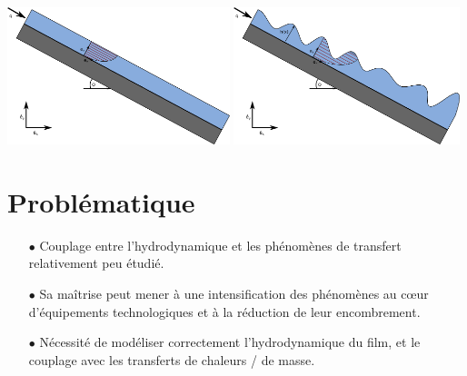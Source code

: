\documentclass[a0,portrait]{a0poster}
\begin{document}
\begin{multicols}{2}
    \begin{multicols}{2}
        \begin{center}\vspace{.2cm}
        \end{center}\vspace{.2cm}
        \columnbreak
        \begin{center}\vspace{.5cm}
        	\includegraphics[height=4cm]{thinfilm}
            \includegraphics[height=4cm]{thinfilm_unstable}
        \end{center}\vspace{.5cm}
    \end{multicols}

    \section*{Problématique}
    \begin{itemize}
    	\item[$\bullet$] Couplage entre l'hydrodynamique et les phénomènes de transfert relativement peu étudié.
    	\item[$\bullet$] Sa maîtrise peut mener à une intensification des phénomènes au cœur d'équipements technologiques et à la réduction de leur encombrement.
    	\item[$\bullet$] Nécessité de modéliser correctement l'hydrodynamique du film, et le couplage avec les transferts de chaleurs / de masse.
    \end{itemize}


\end{multicols}
\end{document}
